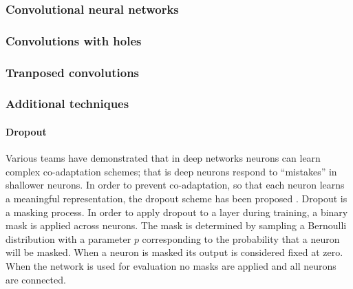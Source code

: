 \subsubsection{Convolutional neural networks}
\subsubsection{Convolutions with holes}
\subsubsection{Tranposed convolutions}
\subsubsection{Additional techniques}
\paragraph{Dropout}
Various teams have demonstrated that in deep networks neurons can learn
complex co-adaptation schemes; that is deep neurons respond to ``mistakes'' in
shallower neurons. In order to prevent co-adaptation, so that each neuron
learns a meaningful representation, the dropout scheme has been proposed 
\cite{JMLR:v15:srivastava14a,DBLP:journals/corr/abs-1207-0580,dahl2013improving}.
Dropout is a masking process. In order to apply dropout to a layer during
training, a binary mask is applied across neurons. The mask is determined by
sampling a Bernoulli distribution with a parameter $p$ corresponding to the
probability that a neuron will be masked. When a neuron is masked its output
is considered fixed at zero. When the network is used for evaluation no masks
are applied and all neurons are connected.
